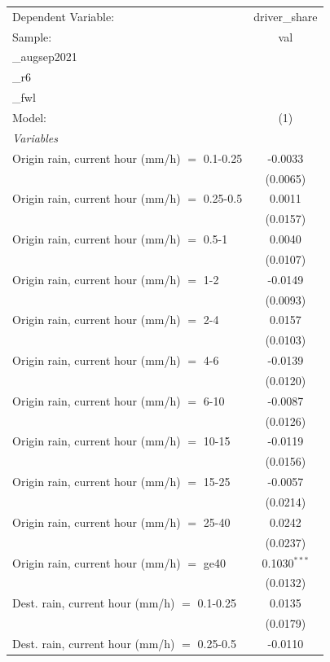 \ifdefined\ifclassloaded
{}
\fi
\begingroup
\centering
\begin{tabular}{lc}
   \tabularnewline \midrule \midrule
   Dependent Variable: & driver\_share\\
   Sample: & val\\_augsep2021\\_r6\\_fwl \\
   Model: & (1)\\
   \midrule
   \emph{Variables}\\
   Origin rain, current hour (mm/h) $=$ 0.1-0.25 & -0.0033\\
    & (0.0065)\\
   Origin rain, current hour (mm/h) $=$ 0.25-0.5 & 0.0011\\
    & (0.0157)\\
   Origin rain, current hour (mm/h) $=$ 0.5-1 & 0.0040\\
    & (0.0107)\\
   Origin rain, current hour (mm/h) $=$ 1-2 & -0.0149\\
    & (0.0093)\\
   Origin rain, current hour (mm/h) $=$ 2-4 & 0.0157\\
    & (0.0103)\\
   Origin rain, current hour (mm/h) $=$ 4-6 & -0.0139\\
    & (0.0120)\\
   Origin rain, current hour (mm/h) $=$ 6-10 & -0.0087\\
    & (0.0126)\\
   Origin rain, current hour (mm/h) $=$ 10-15 & -0.0119\\
    & (0.0156)\\
   Origin rain, current hour (mm/h) $=$ 15-25 & -0.0057\\
    & (0.0214)\\
   Origin rain, current hour (mm/h) $=$ 25-40 & 0.0242\\
    & (0.0237)\\
   Origin rain, current hour (mm/h) $=$ ge40 & 0.1030$^{***}$\\
    & (0.0132)\\
   Dest. rain, current hour (mm/h) $=$ 0.1-0.25 & 0.0135\\
    & (0.0179)\\
   Dest. rain, current hour (mm/h) $=$ 0.25-0.5 & -0.0110\\

\end{tabular}
